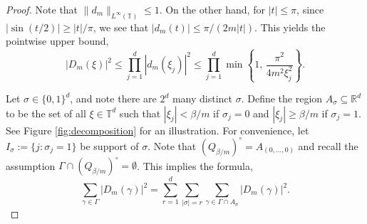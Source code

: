 \documentclass[11pt]{article}
\theoremstyle{definition}
\numberwithin{theorem}{section}
\numberwithin{lemma}{section}
\numberwithin{equation}{section}
\def\R{\mathbb{R}}
\def\T{\mathbb{T}}
\renewcommand{\subset}{\subseteq}
\numberwithin{equation}{section}
\begin{document}
	\begin{proof}
		Note that $\|d_m\|_{L^\infty(\T)}\leq 1$. On the other hand, for $|t|\leq \pi$, since $|\sin(t/2)|\geq |t|/\pi$, we see that $|d_m(t)|\leq \pi/(2m|t|)$. This yields the pointwise upper bound,
		\begin{equation}
			\label{eq:Dupper}
			|D_m(\xi)|^2
			\leq \prod_{j=1}^d |d_m(\xi_j)|^2
			\leq \prod_{j=1}^d \min \left\{1, \, \frac{\pi^2}{4m^2 \xi_j^2} \right\}.
		\end{equation} 
		
		Let $\sigma\in \{0,1\}^d$, and note there are $2^d$ many distinct $\sigma$. Define the region $A_{\sigma}\subset\R^d$ to be the set of all $\xi\in \T^d$ such that $|\xi_j|<\beta/m$ if $\sigma_j=0$ and $|\xi_j|\geq \beta/m$ if $\sigma_j=1$. See Figure \ref{fig:decomposition} for an illustration. For convenience, let $I_{\sigma}:=\{j\colon \sigma_j=1\}$ be support of  $\sigma$. Note that $(Q_{\beta/m})^\circ=A_{(0,\dots,0)}$ and recall the assumption $\Gamma\cap (Q_{\beta/m})^\circ=\emptyset$. This implies the formula, 
		\begin{equation}
			\sum_{\gamma\in \Gamma} |D_m(\gamma)|^2
			=\sum_{r=1}^d \sum_{|\sigma|=r} \sum_{\gamma\in \Gamma\cap A_\sigma} |D_m(\gamma)|^2.  \label{eq:slab}		
		\end{equation}
		

\end{proof}
\end{document}
